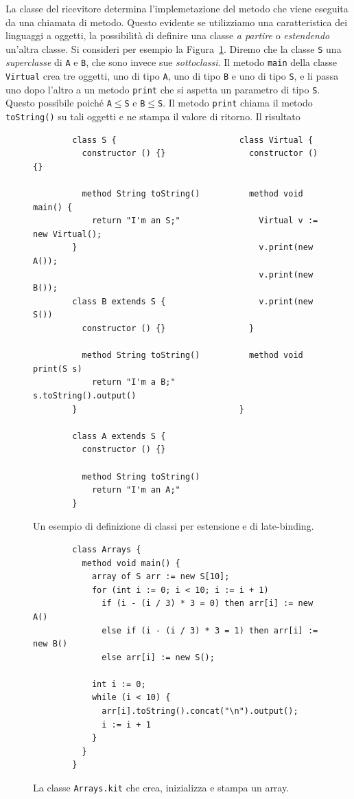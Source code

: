 La classe del ricevitore determina l'implemetazione del metodo che viene
eseguita da una chiamata di metodo. Questo \e evidente se utilizziamo una
caratteristica dei linguaggi a oggetti, \cioe la possibilit\`a di definire
una classe \emph{a partire} o \emph{estendendo} un'altra classe. Si consideri
per esempio la Figura~\ref{fig:extension}.
Diremo che la classe \texttt{S} \e una \emph{superclasse} di \texttt{A}
e \texttt{B}, che sono invece sue \emph{sottoclassi}. Il metodo
\texttt{main} della classe \texttt{Virtual} crea tre oggetti,
uno di tipo \texttt{A}, uno di tipo \texttt{B} e uno di tipo
\texttt{S}, e li passa uno dopo l'altro a un metodo \texttt{print}
che si aspetta un parametro di tipo \texttt{S}. Questo
\e possibile poich\'e \texttt{A}$\le$\texttt{S} e \texttt{B}$\le$\texttt{S}.
Il metodo \texttt{print} chiama il metodo \texttt{toString()} su tali oggetti
e ne stampa il valore di ritorno. Il risultato \e
%
\begin{figure}[t]
\begin{verbatim}
        class S {                         class Virtual {
          constructor () {}                 constructor () {}
                                            
          method String toString()          method void main() {
            return "I'm an S;"                Virtual v := new Virtual();
        }                                     v.print(new A());
                                              v.print(new B());
        class B extends S {                   v.print(new S())
          constructor () {}                 }
                                            
          method String toString()          method void print(S s)
            return "I'm a B;"                s.toString().output()
        }                                 }

        class A extends S {
          constructor () {}

          method String toString()
            return "I'm an A;"
        }
\end{verbatim}
\caption{Un esempio di definizione di classi per estensione e di late-binding.}
  \label{fig:extension}
\end{figure}
%
\begin{figure}[t]
\begin{verbatim}
        class Arrays {
          method void main() {
            array of S arr := new S[10];
            for (int i := 0; i < 10; i := i + 1)
              if (i - (i / 3) * 3 = 0) then arr[i] := new A()
              else if (i - (i / 3) * 3 = 1) then arr[i] := new B()
              else arr[i] := new S();

            int i := 0;
            while (i < 10) {
              arr[i].toString().concat("\n").output();
              i := i + 1
            }
          }
        }
\end{verbatim}
\caption{La classe \texttt{Arrays.kit} che crea, inizializza e
stampa un array.}\label{fig:array}
\end{figure}

